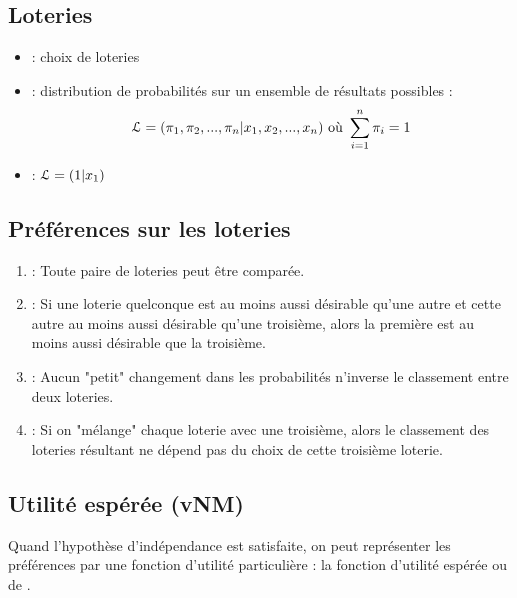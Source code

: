 \subsection{Loteries}

\begin{itemize}
\item {} : choix de loteries
\item {} : distribution de probabilités sur un ensemble de résultats possibles :
\begin{equation*}
\operatorname{\mathcal{L}} = (\pi_1, \pi_2, ..., \pi_n|x_1, x_2, ..., x_n) \text{ où } \displaystyle\sum_{i=1}^{n} \pi_i = 1
\end{equation*}

\item {} : $\operatorname{\mathcal{L}} = (1|x_1)$
\end{itemize}

\subsection{Préférences sur les loteries}

\begin{enumerate}
\item {} : Toute paire de loteries peut être comparée.
\item {} : Si une loterie quelconque est au moins aussi désirable qu'une autre et cette autre au moins aussi désirable qu'une troisième, alors la première est au moins aussi désirable que la troisième.
\item {} : Aucun "petit" changement dans les probabilités n'inverse le classement entre deux loteries.
\item {} : Si on "mélange" chaque loterie avec une troisième, alors le classement des loteries résultant ne dépend pas du choix de cette troisième loterie.
\end{enumerate}

\subsection{Utilité espérée (vNM)}

Quand l'hypothèse d'indépendance est satisfaite, on peut représenter les préférences par une fonction d'utilité particulière : la fonction d'utilité espérée ou de .

